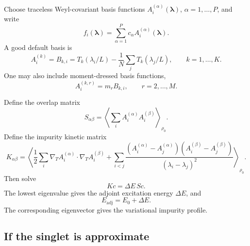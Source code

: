 \documentclass[11pt]{article}
\newcommand{\gradT}{\nabla_{\!T}}
\begin{document}
Choose traceless Weyl-covariant basis functions $A_i^{(\alpha)}(\bm\lambda)$, $\alpha=1,\ldots,P$, and write
\begin{equation}
f_i(\bm\lambda)=\sum_{\alpha=1}^Pc_\alpha A_i^{(\alpha)}(\bm\lambda).
\end{equation}
A good default basis is
\begin{equation}
A_i^{(k)}=B_{k,i}
=T_k(\lambda_i/L)-\frac1N\sum_jT_k(\lambda_j/L),
\qquad k=1,\ldots,K.
\end{equation}
One may also include moment-dressed basis functions,
\begin{equation}
A_i^{(k,r)}=m_rB_{k,i},
\qquad r=2,\ldots,M.
\end{equation}

Define the overlap matrix
\begin{equation}
\boxed{
S_{\alpha\beta}
=\left\langle \sum_iA_i^{(\alpha)}A_i^{(\beta)}\right\rangle_{\rho_0}.
}
\label{eq:impurity_overlap}
\end{equation}
Define the impurity kinetic matrix
\begin{equation}
\boxed{
K_{\alpha\beta}
=\left\langle
\frac12\sum_i\gradT A_i^{(\alpha)}\cdot\gradT A_i^{(\beta)}
+
\sum_{i<j}
\frac{(A_i^{(\alpha)}-A_j^{(\alpha)})(A_i^{(\beta)}-A_j^{(\beta)})}{(\lambda_i-\lambda_j)^2}
\right\rangle_{\rho_0}.
}
\label{eq:impurity_kinetic}
\end{equation}
Then solve
\begin{equation}
\boxed{
Kc=\Delta E\,Sc.
}
\label{eq:generalized_eigen_impurity}
\end{equation}
The lowest eigenvalue gives the adjoint excitation energy $\Delta E$, and
\begin{equation}
E_{\mathrm{adj}}=E_0+\Delta E.
\end{equation}
The corresponding eigenvector gives the variational impurity profile.

\subsection{If the singlet is approximate}
\end{document}
